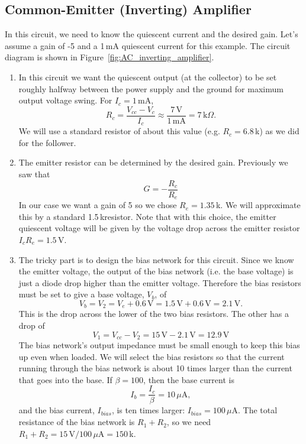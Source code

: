 \documentclass{article}
\begin{document}
\subsection{Common-Emitter (Inverting) Amplifier}
In this circuit, we need to know the quiescent current and the desired gain. Let's assume a gain of -5 and a 1\,mA quiescent current for this example. The circuit diagram is shown in Figure~\ref{fig:AC_inverting_amplifier}.

\begin{enumerate}
\item In this circuit we want the quiescent output (at the collector) to be set roughly halfway between the power supply and the ground for maximum output voltage swing. For $I_c = 1$\,mA, 
\begin{equation}
R_c = \frac{V_{cc} - V_c}{I_c} \approx \frac{7\,\mbox{V}}{1\,\mbox{mA}} = 7\,\mbox{k}\Omega.
\end{equation}
We will use a standard resistor of about this value (e.g. $R_c = 6.8$\,k\Ohm) as we did for the follower.
\item The emitter resistor can be determined by the desired gain. Previously we saw that 
\begin{equation}
G = -\frac{R_c}{R_e}
\end{equation}
In our case we want a gain of 5 so we chose $R_e = 1.35$\,k\Ohm. We will approximate this by a standard 1.5\,k\Ohm resistor. Note that with this choice, the emitter quiescent voltage will be given by the voltage drop across the emitter resistor $I_c R_e = 1.5$\,V.
\item The tricky part is to design the bias network for this circuit. Since we know the emitter voltage, the output of the bias network (i.e. the base voltage) is just a diode drop higher than the emitter voltage. Therefore the bias resistors must be set to give a base voltage, $V_b$, of 
\begin{equation}
V_b = V_2 = V_e + 0.6\,\mbox{V} = 1.5\,\mbox{V} + 0.6\,\mbox{V} = 2.1\,\mbox{V}.
\end{equation}
This is the drop across the lower of the two bias resistors. The other has a drop of 
\begin{equation}
V_1 = V_{cc} - V_2 = 15\,\mbox{V} - 2.1\,\mbox{V} = 12.9\,\mbox{V}
\end{equation}
The bias network's output impedance must be small enough to keep this bias up even when loaded.  We will select the bias resistors so that the current running through the bias network is about 10 times larger than the current that goes into the base. If $\beta = 100$, then the base current is
\begin{equation}
I_b = \frac{I_c}{\beta} = 10\,\mu\mbox{A},
\end{equation}
and the bias current, $I_{bias}$, is ten times larger: $I_{bias} = 100\,\mu$A. The total resistance of the bias network is $R_1 + R_2$, so we need $R_1 + R_2 = 15\,\mbox{V} / 100\,\mu\mbox{A} = 150$\,k\Ohm.


\end{enumerate}
\end{document}
